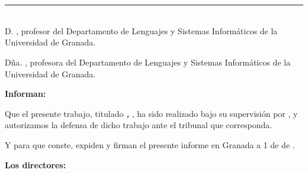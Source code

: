 \chapter*{}
\thispagestyle{empty}

\noindent\rule[-1ex]{\textwidth}{2pt}\\[4.5ex]

D. \textbf{\tfgtutornameA}, profesor del Departamento de Lenguajes y Sistemas Informáticos de la Universidad de Granada.

\vspace{0.5cm}

Dña. \textbf{\tfgtutornameB}, profesora del Departamento de Lenguajes y Sistemas Informáticos de la Universidad de Granada.


\vspace{0.5cm}

\textbf{Informan:}

\vspace{0.5cm}

Que el presente trabajo, titulado \textit{\textbf{\tfgtitlename, \tfgsubtitlename}},
ha sido realizado bajo su supervisión por \textbf{\tfgauthorname}, y autorizamos la defensa de dicho trabajo ante el tribunal
que corresponda.

\vspace{0.5cm}

Y para que conste, expiden y firman el presente informe en Granada a 1 de \tfgmes{} de \tfganno.


\vspace{0.5cm}

\textbf{Los directores:}

\vspace{4cm}

\noindent \textbf{\tfgtutornameA \ \ \ \ \ \tfgtutornameB}